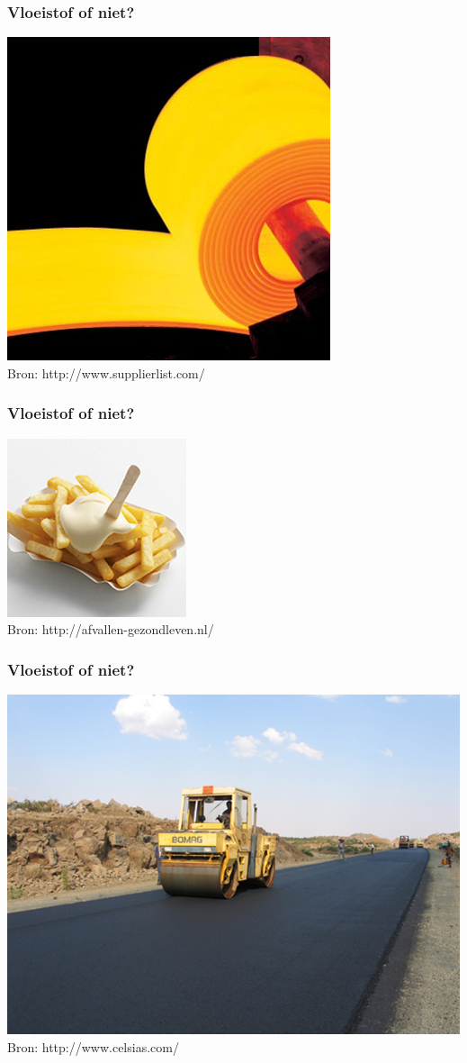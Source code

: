 \documentclass[t]{beamer}
\begin{document}
  		\begin{frame}
  			\frametitle{Vloeistof of niet?}
			\center
    		\includegraphics[height=0.8\textheight]{../fig/basisbegrippen/staal.png}\\
			\footnotesize{Bron: http://www.supplierlist.com/}
  		\end{frame}
  		\begin{frame}
  			\frametitle{Vloeistof of niet?}
			\center
    		\includegraphics[height=0.8\textheight]{../fig/basisbegrippen/mayonaise.png}\\
			\footnotesize{Bron: http://afvallen-gezondleven.nl/}
  		\end{frame}
  		\begin{frame}
  			\frametitle{Vloeistof of niet?}
			\center
    		\includegraphics[height=0.8\textheight]{../fig/basisbegrippen/asfalt.png}\\
			\footnotesize{Bron: http://www.celsias.com/}
  		\end{frame}
\end{document}
